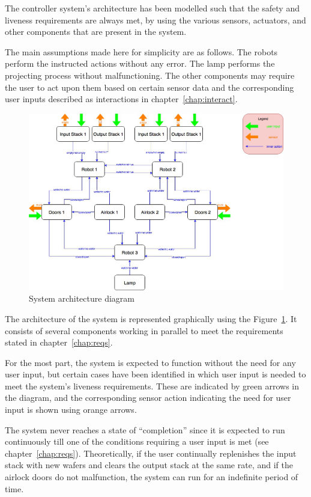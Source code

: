 
The controller system’s architecture has been modelled such that the safety and liveness requirements are always met, by using the various sensors, actuators, and other components that are present in the system.

The main assumptions made here for simplicity are as follows. The robots perform the instructed actions without any error. The lamp performs the projecting process without malfunctioning. The other components may require the user to act upon them based on certain sensor data and the corresponding user inputs described as interactions in chapter~{\ref{chap:interact}}.

\begin{figure}[h]
\centering
\includegraphics[width=150mm]{img/sv-project-arch.png}
\caption{System architecture diagram\label{fig:arch}}
\end{figure}

The architecture of the system is represented graphically using the Figure~{\ref{fig:arch}}. It consists of several components working in parallel to meet the requirements stated in chapter~{\ref{chap:reqs}}.

For the most part, the system is expected to function without the need for any user input, but certain cases have been identified in which user input is needed to meet the system’s liveness requirements. These are indicated by green arrows in the diagram, and the corresponding sensor action indicating the need for user input is shown using orange arrows.

The system never reaches a state of “completion” since it is expected to run continuously till one of the conditions requiring a user input is met (see chapter~{\ref{chap:reqs}}). Theoretically, if the user continually
replenishes the input stack with new wafers and clears the output stack at the same rate, and if the airlock doors do not malfunction, the system can run for an indefinite period of time.
